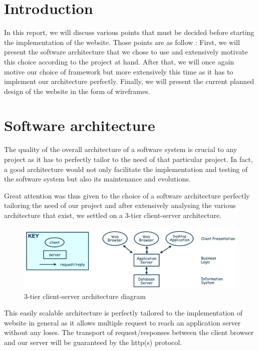 
\section{Introduction}

In this report, we will discuss various points that must be decided before starting the implementation of the website. Those points are as follow : First, we will present the software architecture that we chose to use and extensively motivate this choice according to the project at hand. After that, we will once again motive our choice of framework but more extensively this time as it has to implement our architecture perfectly. Finally, we will present the current planned design of the website in the form of wireframes.

\section{Software architecture}

The quality of the overall architecture of a software system is crucial to any project as it has to perfectly tailor to the need of that particular project. In fact, a good architecture would not only facilitate the implementation and testing of the software system but also its maintenance and evolutions.\newline

Great attention was thus given to the choice of a software architecture perfectly tailoring the need of our project and after extensively analysing the various architecture that exist, we settled on a 3-tier client-server architecture. \newline

\begin{figure}[H]
	\centering
	\includegraphics[width=0.9\linewidth]{ClientServerArchitecture.png}
	\caption{3-tier client-server architecture diagram}
	\label{fig:length_eight_mouse}
\end{figure}

This easily scalable architecture is perfectly tailored to the implementation of website in general as it allows multiple request to reach an application server without any loses. The transport of request/responses between the client browser and our server will be guaranteed by the http(s) protocol. \newline

